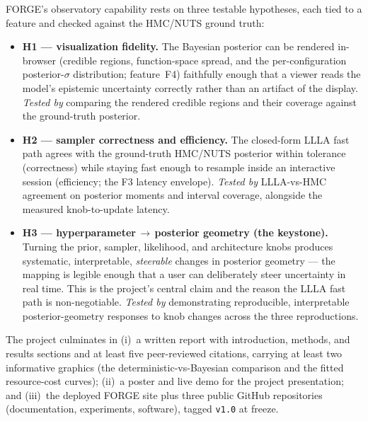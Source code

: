 FORGE's observatory capability rests on three testable hypotheses, each tied to a feature and checked against the HMC/NUTS ground truth:
\begin{itemize}[nosep,leftmargin=1.4em]
  \item \textbf{H1 --- visualization fidelity.} The Bayesian posterior can be rendered in-browser (credible regions, function-space spread, and the per-configuration posterior-$\sigma$ distribution; feature~F4) faithfully enough that a viewer reads the model's epistemic uncertainty correctly rather than an artifact of the display. \emph{Tested by} comparing the rendered credible regions and their coverage against the ground-truth posterior.
  \item \textbf{H2 --- sampler correctness and efficiency.} The closed-form LLLA fast path agrees with the ground-truth HMC/NUTS posterior within tolerance (correctness) while staying fast enough to resample inside an interactive session (efficiency; the F3 latency envelope). \emph{Tested by} LLLA-vs-HMC agreement on posterior moments and interval coverage, alongside the measured knob-to-update latency.
  \item \textbf{H3 --- hyperparameter\,$\rightarrow$\,posterior geometry (the keystone).} Turning the prior, sampler, likelihood, and architecture knobs produces systematic, interpretable, \emph{steerable} changes in posterior geometry --- the mapping is legible enough that a user can deliberately steer uncertainty in real time. This is the project's central claim and the reason the LLLA fast path is non-negotiable. \emph{Tested by} demonstrating reproducible, interpretable posterior-geometry responses to knob changes across the three reproductions.
\end{itemize}

The project culminates in (i)~a written report with introduction, methods, and results sections and at least five peer-reviewed citations, carrying at least two informative graphics (the deterministic-vs-Bayesian comparison and the fitted resource-cost curves); (ii)~a poster and live demo for the project presentation; and (iii)~the deployed FORGE site plus three public GitHub repositories (documentation, experiments, software), tagged \texttt{v1.0} at freeze.

